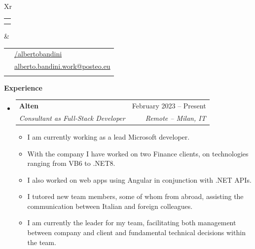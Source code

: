 \documentclass[letterpaper,12pt]{article}[leftmargin=*]
\makeatletter
\def \fullname {Alberto Bandini}
\def \subtitle {}
\def \linkedinicon {\faLinkedin}
\def \linkedinlink {https://linkedin.com/in/albertobandini/}
\def \linkedintext {/albertobandini}
\def \phoneicon {\faPhone}
\def \phonetext {+39 340 53 88 917}
\def \emailicon {\faEnvelope}
\def \emaillink {mailto:alberto.bandini.work@posteo.eu}
\def \emailtext {alberto.bandini.work@posteo.eu}
\def \githubicon {\faGithub}
\def \githublink {https://github.com/dwight-schrute}
\def \githubtext {/dwight-schrute}
\def \websiteicon {\faGlobe}
\def \websitelink {https://google.com/}
\def \websitetext {dwightschrute.com}
\def \headertype {\doublecol} %
\def \entryspacing {-0pt}
\def \linkedin {\linkedinicon \hspace{3pt}\href{\linkedinlink}{\linkedintext}}
\def \phone {\phoneicon \hspace{3pt}{ \phonetext}}
\def \email {\emailicon \hspace{3pt}\href{\emaillink}{\emailtext}}
\def \github {\githubicon \hspace{3pt}\href{\githublink}{\githubtext}}
\def \website {\websiteicon \hspace{3pt}\href{\websitelink}{\websitetext}}
\renewcommand{\section}[2]{\vspace{5pt}
  \colorbox{secondary}{\color{white}\raggedbottom\normalsize\textbf{{#1}{\hspace{7pt}#2}}}
}
\newcommand{\resumeEntryStart}{\begin{itemize}[leftmargin=2.5mm]}
\newcommand{\resumeEntryEnd}{\end{itemize}\vspace{\entryspacing}}
\newcommand{\resumeItemListStart}{\begin{itemize}[leftmargin=4.5mm]}
\newcommand{\resumeItemListEnd}{\end{itemize}}
\newcommand{\resumeItem}[1]{
  \item\small{
    {#1 \vspace{-2pt}}
  }
}
\newcommand{\resumeEntryTSDL}[4]{
  \vspace{-1pt}\item[]
    \begin{tabularx}{0.97\textwidth}{X@{\hspace{60pt}}r}
      \textbf{\color{primary}#1} & {\firabook\color{accent}\small#2} \\
      \textit{\color{accent}\small#3} & \textit{\color{accent}\small#4} \\
    \end{tabularx}\vspace{-6pt}
}
\newcommand{\doublecol}[6]{
  \begin{tabularx}{\textwidth}{Xr}
    {
      \begin{tabular}[c]{l}
        \fontsize{35}{45}\selectfont{\color{primary}{{\textbf{\fullname}}}} \\
        {\textit{\subtitle}} %
      \end{tabular}
    } & {
      \begin{tabular}[c]{l@{\hspace{1.5em}}l}
        {\small#4} & {\small#1} \\
        {\small#5} & {\small#2} \\
        {\small#6} & {\small#3}
      \end{tabular}
    }
  \end{tabularx}
}
\newcommand{\singlecol}[6]{
  \begin{tabularx}{\textwidth}{Xr}
    {
      \begin{tabular}[b]{l}
        \fontsize{35}{45}\selectfont{\color{primary}{{\textbf{\fullname}}}} \\
        {\textit{\subtitle}} %
      \end{tabular}
    } & {
      \begin{tabular}[c]{l}
        {\small#1} \\
        {\small#2} \\
        {\small#3} \\
        {\small#4} \\
        {\small#5} \\
        {\small#6}
      \end{tabular}
    }
  \end{tabularx}
}
\makeatother
\begin{document}

\headertype{\linkedin}{\email}{\phone}{}{}{} %

\vspace{-10pt} %

\section{\faPieChart}{Experience}

  \resumeEntryStart
    \resumeEntryTSDL
      {Alten}{February 2023 -- Present}
      {Consultant as Full-Stack Developer}{Remote -- Milan, IT}
    \resumeItemListStart
      \resumeItem {I am currently working as a lead Microsoft developer.}
      \resumeItem {With the company I have worked on two Finance clients, on technologies ranging from VB6 to .NET8.}
      \resumeItem {I also worked on web apps using Angular in conjunction with .NET APIs.}
      \resumeItem {I tutored new team members, some of whom from abroad, assisting the communication between Italian and foreign colleagues.}
      \resumeItem {I am currently the leader for my team, facilitating both management between company and client and fundamental technical decisions within the team.}
    \resumeItemListEnd
  \resumeEntryEnd

\end{document}
